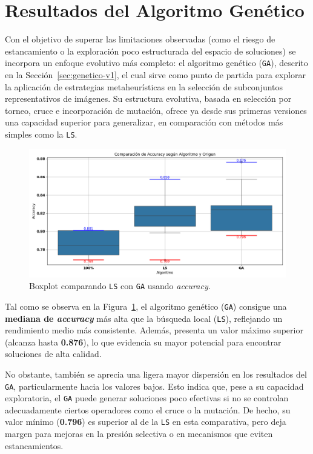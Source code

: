 \section{Resultados del Algoritmo Genético}\label{sec:resultados-algoritmo-genetico}
Con el objetivo de superar las limitaciones observadas (como el riesgo de estancamiento o la exploración poco estructurada del espacio de soluciones)
se incorpora un enfoque evolutivo más completo: el algoritmo genético (\texttt{GA}), descrito en la Sección~\ref{sec:genetico-v1}, el cual sirve como punto de partida para explorar la
aplicación de estrategias metaheurísticas en la selección de subconjuntos representativos de imágenes.
Su estructura evolutiva, basada en selección por torneo, cruce e incorporación de mutación,
ofrece ya desde sus primeras versiones una capacidad superior para generalizar, en comparación con métodos más simples como la \texttt{LS}.

\begin{figure}[htp]
    \centering
    \includegraphics[width=1\textwidth]{imagenes/evaluaciones/comparacion_ls-ga.png}
    \caption{Boxplot comparando \texttt{LS} con \texttt{GA} usando \textit{accuracy}.}
    \label{fig:lr-vs-gen-v1}
\end{figure}

Tal como se observa en la Figura~\ref{fig:lr-vs-gen-v1}, el algoritmo genético (\texttt{GA}) consigue una \textbf{mediana de \textit{accuracy}} más alta que la búsqueda local (\texttt{LS}),
reflejando un rendimiento medio más consistente.
Además, presenta un valor máximo superior (alcanza hasta \textbf{0.876}), lo que evidencia su mayor potencial para encontrar soluciones de alta calidad.

No obstante, también se aprecia una ligera mayor dispersión en los resultados del \texttt{GA}, particularmente hacia los valores bajos.
Esto indica que, pese a su capacidad exploratoria, el \texttt{GA} puede generar soluciones poco efectivas si no se controlan adecuadamente ciertos operadores como el cruce o la mutación.
De hecho, su valor mínimo (\textbf{0.796}) es superior al de la \texttt{LS} en esta comparativa,
pero deja margen para mejoras en la presión selectiva o en mecanismos que eviten estancamientos.


